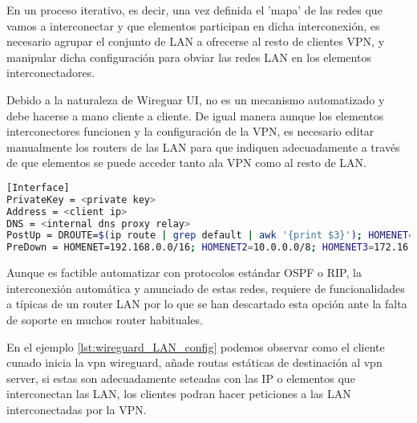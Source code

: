 En un proceso iterativo, es decir, una vez definida el 'mapa' de las redes que vamos a interconectar y que elementos participan en dicha interconexión, es necesario agrupar el conjunto de LAN a ofrecerse al resto de clientes VPN, y manipular dicha configuración para obviar las redes LAN en los elementos interconectadores.

Debido a la naturaleza de Wireguar UI, no es un mecanismo automatizado y debe hacerse a mano cliente a cliente. De igual manera aunque los elementos interconectores funcionen y la configuración de la VPN, es necesario editar manualmente los routers de las LAN para que indiquen adecuadamente a través de que elementos se puede acceder tanto ala VPN como al resto de LAN.

\begin{lstlisting}[language=bash, caption={Ejemplo de configuracion servidor para homenets}, label={lst:wireguard_LAN_config} ]
[Interface]
PrivateKey = <private key>
Address = <client ip>
DNS = <internal dns proxy relay>
PostUp = DROUTE=$(ip route | grep default | awk '{print $3}'); HOMENET=192.168.0.0/16; HOMENET2=10.0.0.0/8; HOMENET3=172.16.0.0/12; ip route add $HOMENET3 via $DROUTE;ip route add $HOMENET2 via $DROUTE; ip route add $HOMENET via $DROUTE;iptables -I OUTPUT -d $HOMENET -j ACCEPT;iptables -A OUTPUT -d $HOMENET2 -j ACCEPT; iptables -A OUTPUT -d $HOMENET3 -j ACCEPT;  iptables -A OUTPUT ! -o %i -m mark ! --mark $(wg show %i fwmark) -m addrtype ! --dst-type LOCAL -j REJECT
PreDown = HOMENET=192.168.0.0/16; HOMENET2=10.0.0.0/8; HOMENET3=172.16.0.0/12; ip route del $HOMENET3 via $DROUTE;ip route del $HOMENET2 via $DROUTE; ip route del $HOMENET via $DROUTE; iptables -D OUTPUT ! -o %i -m mark ! --mark $(wg show %i fwmark) -m addrtype ! --dst-type LOCAL -j REJECT; iptables -D OUTPUT -d $HOMENET -j ACCEPT; iptables -D OUTPUT -d $HOMENET2 -j ACCEPT; iptables -D OUTPUT -d $HOMENET3 -j ACCEPT
\end{lstlisting}

Aunque es factible automatizar con protocolos estándar OSPF o RIP, la interconexión automática y anunciado de estas redes, requiere de funcionalidades a típicas de un router LAN por lo que se han descartado esta opción ante la falta de soporte en muchos router habituales.

En el ejemplo \ref{lst:wireguard_LAN_config} podemos observar como el cliente cunado inicia la vpn wireguard, añade routas estáticas de destinación al vpn server, si estas son adecuadamente seteadas con las IP o elementos que interconectan las LAN, los clientes podran hacer peticiones a las LAN interconectadas por la VPN.


